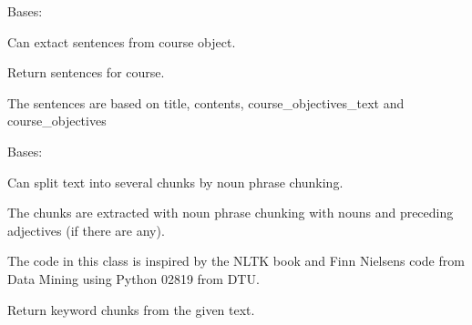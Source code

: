 \documentclass[letterpaper,10pt,english]{sphinxmanual}
\begin{document}
\begin{fulllineitems}
\label{cv_kickstarter:cv_kickstarter.course_keyword_tokenizer.CourseSentenceExtractor}
Bases: 

Can extact sentences from course object.

\begin{fulllineitems}
\label{cv_kickstarter:cv_kickstarter.course_keyword_tokenizer.CourseSentenceExtractor.sentences}
Return sentences for course.

The sentences are based on title, contents, course\_objectives\_text
and course\_objectives

\end{fulllineitems}


\end{fulllineitems}


\begin{fulllineitems}
\label{cv_kickstarter:cv_kickstarter.course_keyword_tokenizer.TextKeywordChunkifier}
Bases: 

Can split text into several chunks by noun phrase chunking.

The chunks are extracted with noun phrase chunking with nouns and preceding
adjectives (if there are any).

The code in this class is inspired by the NLTK book and Finn Nielsens
code from Data Mining using Python 02819 from DTU.

\begin{fulllineitems}
\label{cv_kickstarter:cv_kickstarter.course_keyword_tokenizer.TextKeywordChunkifier.chunks}
Return keyword chunks from the given text.

\end{fulllineitems}


\end{fulllineitems}
\end{document}
